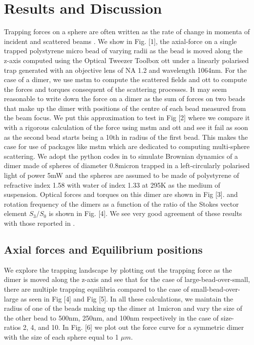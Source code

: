 \documentclass[preprint,  3p]{elsarticle}
\begin{document}
\section{Results and Discussion}

Trapping forces on a sphere are often written as the rate of change in momenta of incident and scattered beams \cite{Nieminen_2007}. We show in Fig. [1], the axial-force on a single trapped polystyrene micro bead of varying radii as the bead is moved along the z-axis computed using the Optical Tweezer Toolbox ott under a linearly polarised trap generated with an objective lens of NA 1.2 and wavelength 1064nm. For the case of a dimer, we use mstm to compute the scattered fields and ott to compute the forces and torques consequent of the scattering processes. It may seem reasonable to write down the force on a dimer as the sum of forces on two beads that make up the dimer with positions of the centre of each bead measured from the beam focus. We put this approximation to test in Fig [2] where we compare it with a rigorous calculation of the force using mstm and ott and see it fail as soon as the second bead starts being a 10th in radius of the first bead. This makes the case for use of packages like mstm which are dedicated to computing multi-sphere scattering. We adopt the python codes in \cite{Vigilante_2020} to simulate Brownian dynamics of a dimer made of spheres of diameter 0.8micron trapped in a left-circularly polarised light of power 5mW and the spheres are assumed to be made of polystyrene of refractive index 1.58 with water of index 1.33 at 295K as the medium of suspension. Optical forces and torques on this dimer are shown in Fig [3].  and rotation frequency of the dimers as a function of the ratio of the Stokes vector element $S_3/S_0$ is shown in Fig. [4]. We see very good agreement of these results with those reported in \cite{Vigilante_2020}. 


\subsection{Axial forces and Equilibrium positions}

We explore the trapping landscape by plotting out the trapping force as the dimer is moved along the z-axis and see that for the case of large-bead-over-small, there are multiple trapping equilibria compared to the case of small-bead-over-large as seen in Fig [4] and Fig [5]. In all these calculations, we maintain the radius of one of the beads making up the dimer at 1micron and vary the size of the other bead to 500nm, 250nm, and 100nm respectively in the case of size-ratios 2, 4, and 10. In Fig. [6] we plot out the force curve for a symmetric dimer with the size of each sphere equal to 1 $\mu m$.  
\end{document}
